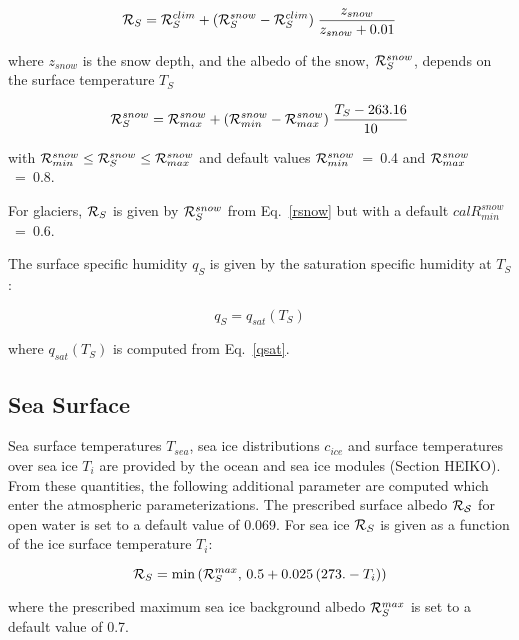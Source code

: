 \begin{equation}
{\cal R}_S={\cal R}_S^{clim} + ({\cal R}_S^{snow}-{\cal R}_S^{clim}) \;
\frac{z_{snow}}{z_{snow} + 0.01}   
\end{equation} 

where $z_{snow}$ is the snow depth, and the albedo of the snow, ${\cal R}_S^{snow}$,
depends on
the surface temperature $T_S$

\begin{equation}\label{rsnow}
{\cal R}_S^{snow}={\cal R}_{max}^{snow} + ({\cal R}_{min}^{snow} - {\cal 
R}_{max}^{snow}) \; \frac{T_S -
263.16}{10}
\end{equation}

with ${\cal R}_{min}^{snow} \le {\cal R}_S^{snow} \le {\cal R}_{max}^{snow}$ and default
values
${\cal R}_{min}^{snow}$~=~0.4 and ${\cal R}_{max}^{snow}$~=~0.8.

For glaciers, ${\cal R}_S$ is given by ${\cal R}_S^{snow}$ from Eq.~\ref{rsnow} but with a
default 
${cal R}_{min}^{snow}$~=~0.6.

The surface specific humidity $q_S$ is given by the saturation specific humidity at $T_S$:

\begin{equation}
q_S =q_{sat}(T_S)
\end{equation}

where $q_{sat}(T_S)$ is computed from
Eq.~\ref{qsat}. 

\subsection{Sea Surface}\label{seasurf}

Sea surface temperatures $T_{sea}$, sea  ice distributions
$c_{ice}$ and surface temperatures over
sea ice $T_i$ are provided by the ocean and sea
ice modules (Section HEIKO). From
these quantities, the following additional parameter are
computed which enter the atmospheric
parameterizations. The prescribed surface albedo ${\cal R_S}$
for open water is set to a default value of
0.069. For sea ice ${\cal R}_S$  is given as a function of the ice
surface temperature $T_{i}$:

\begin{equation}
{\cal R}_S=\min{({\cal R}_S^{max}, \, 0.5 + 0.025 \, (273. - T_{i}))} 
\end{equation} 

where the prescribed maximum sea ice background
albedo ${\cal R}_S^{max}$ is set to a default value
of  0.7. 

